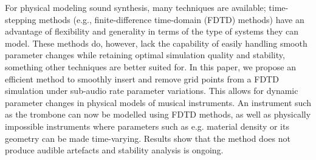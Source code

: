 For physical modeling sound synthesis, many techniques are available; time-stepping methods (e.g., finite-difference time-domain (FDTD) methods) have an advantage of flexibility and generality in terms of the type of systems they can model. These methods do, however, lack the capability of easily handling smooth parameter changes 
while retaining optimal simulation quality and stability, something other techniques are better suited for. In this paper, we propose an efficient method to smoothly insert and remove grid points from a FDTD simulation under sub-audio rate parameter variations. This allows for dynamic parameter changes in physical models of musical instruments. An instrument such as the trombone can now be modelled using FDTD methods, as well as physically impossible instruments where parameters such as e.g. material density or its geometry can be made time-varying. Results show that the method does not produce audible artefacts and stability analysis is ongoing.

